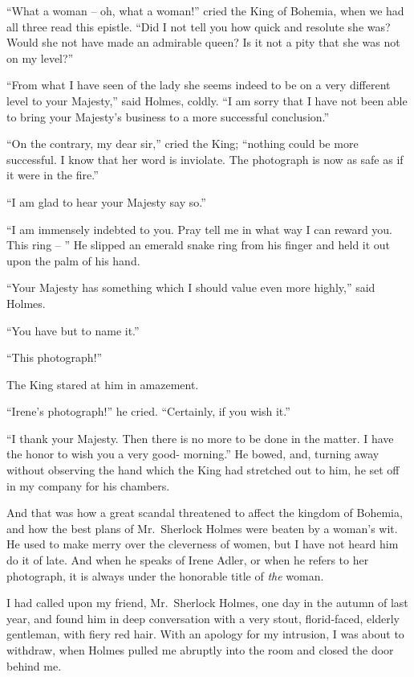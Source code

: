 “What a woman -- oh, what a woman!” cried the King of
Bohemia, when we had all three read this epistle. “Did I
not tell you how quick and resolute she was? Would she not
have made an admirable queen? Is it not a pity that she
was not on my level?”

“From what I have seen of the lady she seems indeed to
be on a very different level to your Majesty,” said Holmes,
coldly. “I am sorry that I have not been able to bring your
Majesty’s business to a more successful conclusion.”

“On the contrary, my dear sir,” cried the King; “nothing
could be more successful. I know that her word is inviolate.
The photograph is now as safe as if it were in the fire.”

“I am glad to hear your Majesty say so.”

“I am immensely indebted to you. Pray tell me in what
way I can reward you. This ring -- ” He slipped an emerald
snake ring from his finger and held it out upon the palm of
his hand.

“Your Majesty has something which I should value even
more highly,” said Holmes.

“You have but to name it.”

“This photograph!”

The King stared at him in amazement.

“Irene’s photograph!” he cried. “Certainly, if you wish it.”

“I thank your Majesty. Then there is no more to be done
in the matter. I have the honor to wish you a very good-%
morning.” He bowed, and, turning away without observing
the hand which the King had stretched out to him, he set off
in my company for his chambers.

\strut

And that was how a great scandal threatened to affect the
kingdom of Bohemia, and how the best plans of Mr.~Sherlock
Holmes were beaten by a woman’s wit. He used to make
merry over the cleverness of women, but I have not heard
him do it of late. And when he speaks of Irene Adler, or
when he refers to her photograph, it is always under the
honorable title of \textit{the} woman.

\vspace{0em plus 1em}

I had called upon my friend, Mr.~Sherlock Holmes,
one day in the autumn of last year, and found him
in deep conversation with a very stout, florid-faced,
elderly gentleman, with fiery red hair. With an
apology for my intrusion, I was about to withdraw, when
Holmes pulled me abruptly into the room and closed the
door behind me.

